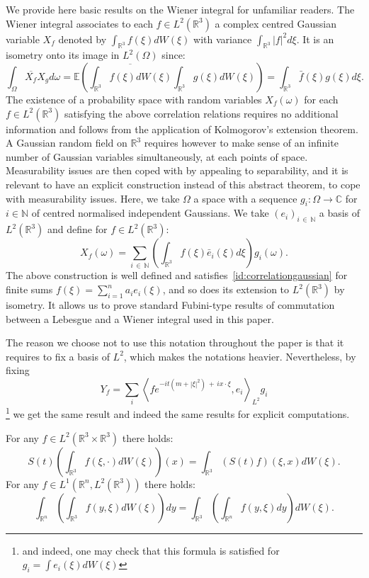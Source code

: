 \documentclass[AHL, Unicode, longabstracts,published]{cedram}
\newcommand{\R}{\mathbb{R}}
\newcommand{\C}{\mathbb{C}}
\newcommand{\N}{\mathbb{N}}
\newcommand{\E}{\mathbb{E}}
\begin{document}
We provide here basic results on the Wiener integral for unfamiliar readers. The Wiener integral associates to each $f\in L^2(\R^3)$ a complex centred Gaussian variable $X_f$ denoted by $\int_{\R^3} f(\xi) dW(\xi) $ with variance $\int_{\R^3} |f|^2d\xi$. It is an isometry onto its image in $L^2(\Omega)$ since:
\begin{equation} \label{id:correlationgaussian}
\int_\Omega \overline{X_f}X_g d\omega=\E \left(\overline{\int_{\R^3} f(\xi)dW(\xi)} \int_{\R^3} g(\xi)dW(\xi) \right)=\int_{\R^3} \bar f(\xi)g(\xi)d\xi.
\end{equation}
The existence of a probability space with random variables $X_f(\omega)$ for each $f\in L^2(\R^3)$ satisfying the above correlation relations requires no additional information and follows from the application of Kolmogorov's extension theorem. A Gaussian random field on $\R^3$ requires however to make sense of an infinite number of Gaussian variables simultaneously, at each points of space. Measurability issues are then coped with by appealing to separability, and it is relevant to have an explicit construction instead of this abstract theorem, to cope with measurability issues. Here, we take $\Omega$ a space with a sequence $g_i:\Omega \rightarrow \C$ for $i\in \N$ of centred normalised independent Gaussians. We take $(e_i)_{i\,\in\,\N}$ a basis of $L^2(\R^3)$ and define for $f\in L^2(\R^3)$:
\begin{equation} \label{id:explicitwhitenoise}
X_f(\omega)=\sum_{i\,\in\,\N} \left(\int_{\R^3} f (\xi)\bar e_i(\xi)d\xi\right)g_i(\omega).
\end{equation}
The above construction is well defined and satisfies~\eqref{id:correlationgaussian} for finite sums $f(\xi)=\sum_{i=1}^n a_ie_i(\xi)$, and so does its extension to $L^2(\R^3)$ by isometry. It allows us to prove standard Fubini-type results of commutation between a Lebesgue and a Wiener integral used in this paper.

The reason we choose not to use this notation throughout the paper is that it requires to fix a basis of $L^2$, which makes the notations heavier. Nevertheless, by fixing
\[
Y_f = \sum_i \left\langle fe^{-it\left(m+|\xi|^2\right)\,+ \,ix\cdot \xi}, e_i\right\rangle_{L^2} g_i
\]
\footnote{and indeed, one may check that this formula is satisfied for $g_i = \int e_i(\xi)dW(\xi)$}
we get the same result and indeed the same results for explicit computations.

\begin{lemm}
For any $f\in L^2(\R^3\times \R^3)$ there holds:
\begin{equation} \label{id:fubinischrodingerwiener}
S(t) \left(\int_{\R^3} f(\xi,\cdot)dW(\xi) \right)(x)= \int_{\R^3} (S(t) f)(\xi,x)dW(\xi).
\end{equation}
For any $f\in L^1(\R^n,L^2 (\R^3))$ there holds:
\begin{equation} \label{id:fubinilebesguewiener}
\int_{\R^n} \left(\int_{\R^3} f(y,\xi)dW(\xi)\right)dy=\int_{\R^3} \left(\int_{\R^n} f(y,\xi)dy \right)dW(\xi).
\end{equation}
\end{lemm}
\end{document}
